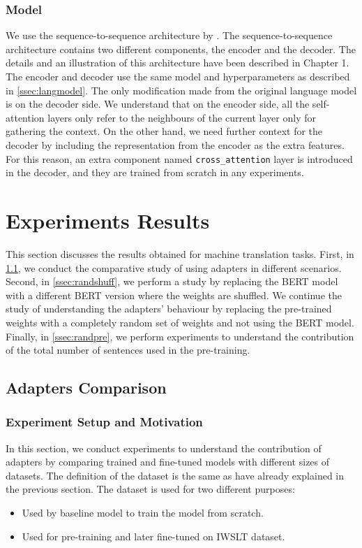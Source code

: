 \subsubsection{Model}
We use the sequence-to-sequence architecture by \cite{vaswani2017attention}. The sequence-to-sequence architecture contains two different components, the encoder and the decoder. The details and an illustration of this architecture have been described in Chapter 1. The encoder and decoder use the same model and hyperparameters as described in \cref{ssec:langmodel}. The only modification made from the original language model is on the decoder side. We understand that on the encoder side, all the self-attention layers only refer to the neighbours of the current layer only for gathering the context. On the other hand, we need further context for the decoder by including the representation from the encoder as the extra features. For this reason, an extra component named \texttt{cross\_attention} layer is introduced in the decoder, and they are trained from scratch in any experiments.

\section{Experiments Results}
This section discusses the results obtained for machine translation tasks. First, in \cref{ssec:adaptcomp}, we conduct the comparative study of using adapters in different scenarios. Second, in \cref{ssec:randshuff}, we perform a study by replacing the BERT model with a different BERT version where the weights are shuffled. We continue the study of understanding the adapters' behaviour by replacing the pre-trained weights with a completely random set of weights and not using the BERT model. Finally, in \cref{ssec:randpre}, we perform experiments to understand the contribution of the total number of sentences used in the pre-training.

\subsection{Adapters Comparison}
\label{ssec:adaptcomp}
\subsubsection{Experiment Setup and Motivation}
In this section, we conduct experiments to understand the contribution of adapters by comparing trained and fine-tuned models with different sizes of datasets. The definition of the dataset is the same as have already explained in the previous section. The dataset is used for two different purposes:
\begin{itemize}
    \item Used by baseline model to train the model from scratch.
    \item Used for pre-training and later fine-tuned on IWSLT dataset.
\end{itemize}


